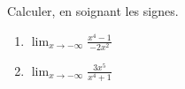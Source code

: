 \documentclass[11pt,a4paper]{article}
\begin{document}
\begin{exercice}
Calculer, en soignant les signes.
\begin{enumerate}[label=\alph*),leftmargin=2em,itemsep=3pt]
  \item $\displaystyle\lim_{x\to-\infty}\frac{x^4-1}{-2x^2}$
  \item $\displaystyle\lim_{x\to-\infty}\frac{3x^5}{x^4+1}$
\end{enumerate}
\end{exercice}
\end{document}

